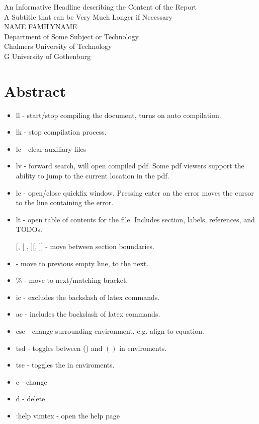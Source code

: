 An Informative Headline describing the Content of the Report\\
A Subtitle that can be Very Much Longer if Necessary\\
NAME FAMILYNAME\\
Department of Some Subject or Technology\\
Chalmers University of Technology\\
\if\InstitutionLocation G
University of Gothenburg\\
\fi
\setlength{\parskip}{0.5cm}

\thispagestyle{plain}			%
\setlength{\parskip}{0pt plus 1.0pt}
\section*{Abstract}

\begin{itemize}
    \item ll - start/stop compiling the document, turns on auto compilation.
    \item lk - stop compilation process. 
    \item lc - clear auxiliary files 
    \item lv - forward search, will open compiled pdf. Some pdf viewers support the ability to jump to the current location in the pdf. 
    \item le - open/close quickfix window. Pressing enter on the error moves the cursor to the line containing the error. 
    \item lt - open table of contents for the file. Includes section, labels, references, and TODOs. 
    \item [[, [], ][, ]] - move between section boundaries. 
    \item { - move to previous empty line, } to the next. 
    \item \% - move to next/matching bracket. 
    \item ic - excludes the backslash of latex commands. 
    \item ac - includes the backslash of latex commands. 
    \item cse - change surrounding environment, e.g. align to equation. 
    \item tsd - toggles between () and \( \left( \right) \) in enviroments.
    \item tse - toggles the \* in enviroments.
    \item c - change 
    \item d - delete 
    \item :help vimtex - open the help page

\end{itemize}



